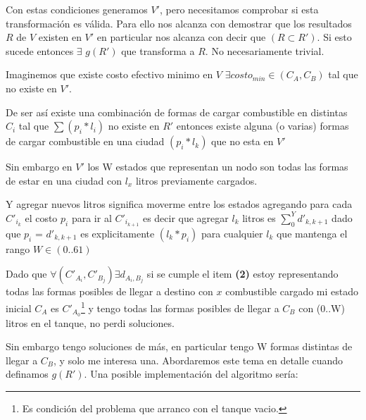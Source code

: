 \documentclass[12pt]{article}
\begin{document}
Con estas condiciones generamos $V'$, pero necesitamos comprobar si esta transformación es válida. Para ello nos alcanza con demostrar que los resultados $R$ de $V$ existen en $V'$ en particular nos alcanza con decir que $(R \subset R')$. Si esto sucede entonces $\exists$ $g(R')$ que transforma a $R$. No necesariamente trivial.

Imaginemos que existe costo efectivo minimo en $V$  $\exists costo_{min} \in (C_A,C_B)$ tal que no existe en $V'$.

De ser así existe una combinación de formas de cargar combustible en distintas $C_i$ tal que $\sum (p_i * l_i)$ no existe en $R'$ entonces existe alguna (o varias) formas de cargar combustible en una ciudad $(p_i * l_k)$ que no esta en $V'$

Sin embargo en $V'$ los W estados que representan un nodo son todas las formas de estar en una ciudad con $l_x$ litros previamente cargados.

Y agregar nuevos litros significa moverme entre los estados agregando para cada $C'_{i_k}$ el costo $p_i$ para ir al $C'_{i_{k+1}}$ es decir que agregar $l_k$ litros es $\sum_0^Y d'_{k,k+1}$ dado que $p_i$ = $d'_{k,k+1}$ es explicitamente $(l_k * p_i)$ para cualquier $l_k$ que mantenga el rango $W \in (0..61)$

Dado que $\forall (C'_{A_i}, C'_{B_j}) \exists d_{A_i,B_j}$ si se cumple el item \textbf{(2)} estoy representando todas las formas posibles de llegar a destino con $x$ combustible cargado mi estado inicial $C_A$ es $C'_{A_0}$\footnote{Es condición del problema que arranco con el tanque vacio.} y tengo todas las formas posibles de llegar a $C_{B}$ con (0..W) litros en el tanque, no perdi soluciones.

Sin embargo tengo soluciones de más, en particular tengo W formas distintas de llegar a $C_B$, y solo me interesa una. Abordaremos este tema en detalle cuando definamos $g(R')$. Una posible implementación del algoritmo sería:
\end{document}
